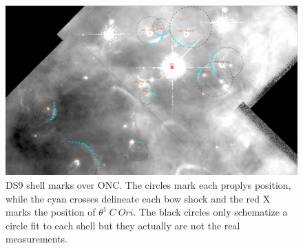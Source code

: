 \begin{figure}
\includegraphics[width=\linewidth]{LV-full-field-annotated.png}
\caption{DS9 shell marks over ONC. The circles mark each proplys position, while the cyan crosses delineate each bow shock and the red X marks the position of $\theta^1 ~C~Ori$. 
The black circles only schematize a circle fit to each shell but they actually are not the real measurements.}
\label{fig:radii-measures-example}
\end{figure}




